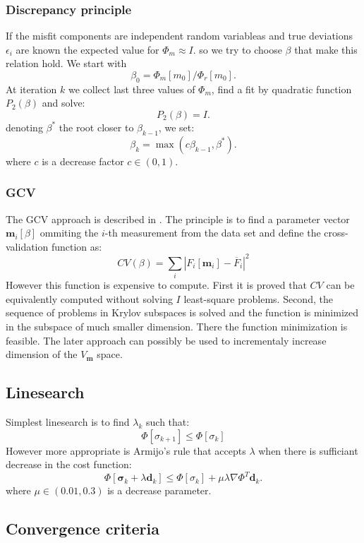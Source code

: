 \documentclass[a4paper, 12pt]{book}
\theoremstyle{definition}
\def\grad{\nabla}
\def\vc#1{\mathbf{\boldsymbol{#1}}}     %
\begin{document}
\subsubsection{Discrepancy principle}
If the misfit components are independent random variableas and true deviations $\epsilon_i$ are known the expected value for $\Phi_m \approx I$.
so we try to choose $\beta$ that make this relation hold. We start with
\[
  \beta_0 = \Phi_m[m_0]/ \Phi_r[m_0].
\]
At iteration $k$ we collect last three values of $\Phi_m$, find a fit by quadratic function $P_2(\beta)$ and solve:
\[
    P_2(\beta) = I.
\]
denoting $\beta^*$ the root closer to $\beta_{k-1}$, we set:
\[
    \beta_k = \max( c\beta_{k-1}, \beta^*).
\]
where $c$ is a decrease factor $c\in (0,1)$.

\subsubsection{GCV}
The GCV approach is described in \cite{haber_gcv_2000}. The principle is to find a parameter vector $\vc m_i[\beta]$ ommiting
the $i$-th measurement from the data set and define the cross-validation function as:
\[
  CV(\beta) = \sum_i |F_i[\vc m_i] - \overline{F}_i |^2
\]
However this function is expensive to compute. First it is proved that $CV$ can be equivalently computed without solving $I$ least-square problems.
Second, the sequence of problems in Krylov subspaces is solved and the function is minimized in the subspace of much smaller dimension. There the function minimization
is feasible. The later approach can possibly be used to incrementaly increase dimension of the $V_{\vc m}$ space.




\subsection{Linesearch}
\label{sec:linesearch}
Simplest linesearch is to find $\lambda_k$ such that:
\[
    \Phi[\sigma_{k+1}] \le \Phi[\sigma_k]
\]
However more appropriate is Armijo's rule \cite{wiki_backtracking_2017} that accepts $\lambda$ when there is sufficiant
decrease in the cost function:
\[
    \Phi[\vc \sigma_{k} + \lambda \vc d_k] \le \Phi[\sigma_k] + \mu \lambda \grad \Phi^T \vc d_k.
\]
where $\mu \in (0.01,0.3)$ is a decrease parameter.


\subsection{Convergence criteria}
\label{sec:conv_crit}
\end{document}
